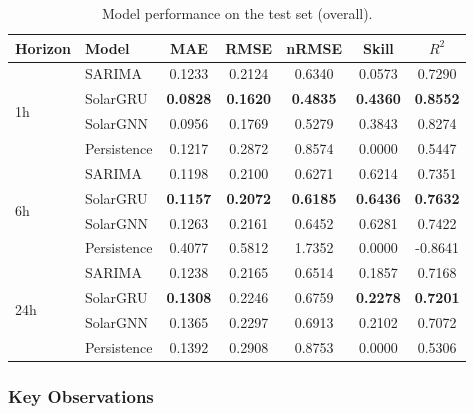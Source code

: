 \documentclass[11pt,a4paper]{article}
\begin{document}
\begin{table}[H]
\centering
\caption{Model performance on the test set (overall).}
\label{tab:results_overall}
\begin{tabular}{llccccc}
\toprule
\textbf{Horizon} & \textbf{Model} & \textbf{MAE} & \textbf{RMSE} & \textbf{nRMSE} & \textbf{Skill} & \textbf{$R^2$} \\
\midrule
\multirow{4}{*}{1h} 
& SARIMA & 0.1233 & 0.2124 & 0.6340 & 0.0573 & 0.7290 \\
& SolarGRU & \textbf{0.0828} & \textbf{0.1620} & \textbf{0.4835} & \textbf{0.4360} & \textbf{0.8552} \\
& SolarGNN & 0.0956 & 0.1769 & 0.5279 & 0.3843 & 0.8274 \\
& Persistence & 0.1217 & 0.2872 & 0.8574 & 0.0000 & 0.5447 \\
\midrule
\multirow{4}{*}{6h}
& SARIMA & 0.1198 & 0.2100 & 0.6271 & 0.6214 & 0.7351 \\
& SolarGRU & \textbf{0.1157} & \textbf{0.2072} & \textbf{0.6185} & \textbf{0.6436} & \textbf{0.7632} \\
& SolarGNN & 0.1263 & 0.2161 & 0.6452 & 0.6281 & 0.7422 \\
& Persistence & 0.4077 & 0.5812 & 1.7352 & 0.0000 & -0.8641 \\
\midrule
\multirow{4}{*}{24h}
& SARIMA & 0.1238 & 0.2165 & 0.6514 & 0.1857 & 0.7168 \\
& SolarGRU & \textbf{0.1308} & 0.2246 & 0.6759 & \textbf{0.2278} & \textbf{0.7201} \\
& SolarGNN & 0.1365 & 0.2297 & 0.6913 & 0.2102 & 0.7072 \\
& Persistence & 0.1392 & 0.2908 & 0.8753 & 0.0000 & 0.5306 \\
\bottomrule
\end{tabular}
\end{table}

\subsubsection{Key Observations}
\end{document}
